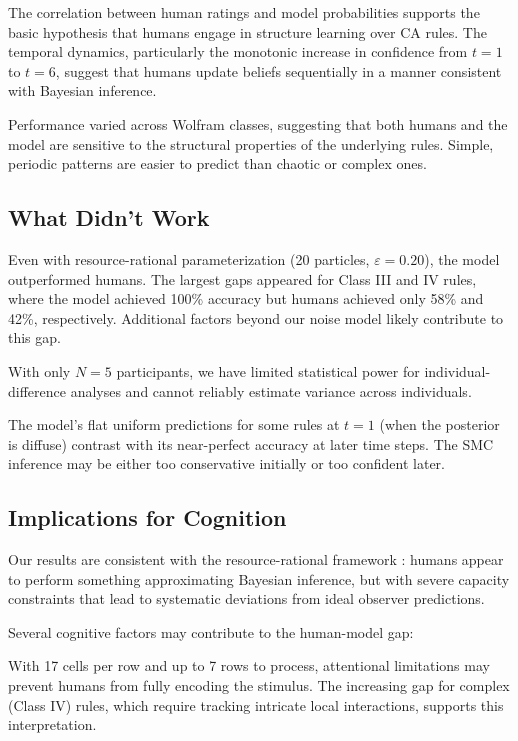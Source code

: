 \documentclass[10pt,letterpaper]{article}
\begin{document}
The correlation between human ratings and model probabilities supports the basic hypothesis that humans engage in structure learning over CA rules. The temporal dynamics, particularly the monotonic increase in confidence from $t=1$ to $t=6$, suggest that humans update beliefs sequentially in a manner consistent with Bayesian inference.

Performance varied across Wolfram classes, suggesting that both humans and the model are sensitive to the structural properties of the underlying rules. Simple, periodic patterns are easier to predict than chaotic or complex ones.

\subsection{What Didn't Work}

Even with resource-rational parameterization (20 particles, $\varepsilon = 0.20$), the model outperformed humans. The largest gaps appeared for Class III and IV rules, where the model achieved 100\% accuracy but humans achieved only 58\% and 42\%, respectively. Additional factors beyond our noise model likely contribute to this gap.

With only $N=5$ participants, we have limited statistical power for individual-difference analyses and cannot reliably estimate variance across individuals.

The model's flat uniform predictions for some rules at $t=1$ (when the posterior is diffuse) contrast with its near-perfect accuracy at later time steps. The SMC inference may be either too conservative initially or too confident later.

\subsection{Implications for Cognition}

Our results are consistent with the resource-rational framework \cite{griffiths2024bayesian}: humans appear to perform something approximating Bayesian inference, but with severe capacity constraints that lead to systematic deviations from ideal observer predictions.

Several cognitive factors may contribute to the human-model gap:

With 17 cells per row and up to 7 rows to process, attentional limitations may prevent humans from fully encoding the stimulus. The increasing gap for complex (Class IV) rules, which require tracking intricate local interactions, supports this interpretation.
\end{document}

